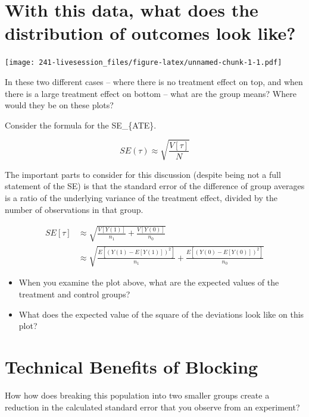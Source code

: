 \documentclass[
]{book}
\providecommand{\tightlist}{%
  \setlength{\itemsep}{0pt}\setlength{\parskip}{0pt}}
\begin{document}
\hypertarget{with-this-data-what-does-the-distribution-of-outcomes-look-like}{%
\section{With this data, what does the distribution of outcomes look
like?}\label{with-this-data-what-does-the-distribution-of-outcomes-look-like}}

\texttt{[image: 241-livesession\_files/figure-latex/unnamed-chunk-1-1.pdf]}

In these two different cases -- where there is no treatment effect on
top, and when there is a large treatment effect on bottom -- what are
the group means? Where would they be on these plots?

Consider the formula for the SE\_\{ATE\}.

\[
  SE(\tau) \approx \sqrt{\frac{V[\tau]}{N}}
\]

The important parts to consider for this discussion (despite being not a
full statement of the SE) is that the standard error of the difference
of group averages is a ratio of the underlying variance of the treatment
effect, divided by the number of observations in that group.

\[
  \begin{aligned}
  SE[\tau] & \approx \sqrt{\frac{V[Y(1)]}{n_{1}} + \frac{V[Y(0)]}{n_{0}}} \\ 
           & \approx \sqrt{\frac{E[\left(Y(1) - E[Y(1)]\right)^2]}{n_{1}} + \frac{E[\left(Y(0) - E[Y(0)]\right)^2]}{n_{0}}}
  \end{aligned}
\]

\begin{itemize}
\tightlist
\item
  When you examine the plot above, what are the expected values of the
  treatment and control groups?
\item
  What does the expected value of the square of the deviations look like
  on this plot?
\end{itemize}

\hypertarget{technical-benefits-of-blocking}{%
\section{Technical Benefits of
Blocking}\label{technical-benefits-of-blocking}}

How how does breaking this population into two smaller groups create a
reduction in the calculated standard error that you observe from an
experiment?
\end{document}
